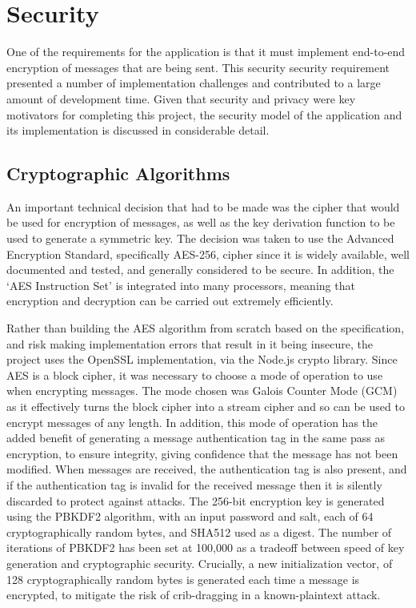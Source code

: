 \section{Security}
One of the requirements for the application is that it must implement end-to-end encryption of messages that are being sent. This security security requirement presented a number of implementation challenges and contributed to a large amount of development time. Given that security and privacy were key motivators for completing this project, the security model of the application and its implementation is discussed in considerable detail.

\subsection{Cryptographic Algorithms}
An important technical decision that had to be made was the cipher that would be used for encryption of messages, as well as the key derivation function to be used to generate a symmetric key. The decision was taken to use the Advanced Encryption Standard, specifically AES-256, cipher since it is widely available, well documented and tested, and generally considered to be secure. In addition, the `AES Instruction Set' is integrated into many processors, meaning that encryption and decryption can be carried out extremely efficiently. 

Rather than building the AES algorithm from scratch based on the specification, and risk making implementation errors that result in it being insecure, the project uses the OpenSSL implementation, via the Node.js crypto library. Since AES is a block cipher, it was necessary to choose a mode of operation to use when encrypting messages. The mode chosen was Galois Counter Mode (GCM) as it effectively turns the block cipher into a stream cipher and so can be used to encrypt messages of any length. In addition, this mode of operation has the added benefit of generating a message authentication tag in the same pass as encryption, to ensure integrity, giving confidence that the message has not been modified. When messages are received, the authentication tag is also present, and if the authentication tag is invalid for the received message then it is silently discarded to protect against attacks. The 256-bit encryption key is generated using the PBKDF2 algorithm, with an input password and salt, each of 64 cryptographically random bytes, and SHA512 used as a digest. The number of iterations of PBKDF2 has been set at 100,000 as a tradeoff between speed of key generation and cryptographic security. Crucially, a new initialization vector, of 128 cryptographically random bytes is generated each time a message is encrypted, to mitigate the risk of crib-dragging in a known-plaintext attack.

